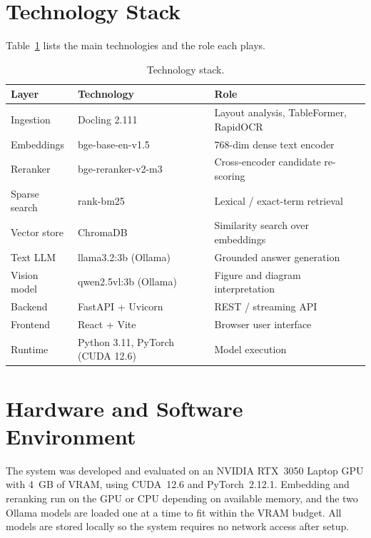 \documentclass[12pt,a4paper]{report}
\begin{document}
\section{Technology Stack}
Table~\ref{tab:stack} lists the main technologies and the role each plays.

\begin{table}[htbp]
\centering
\caption{Technology stack.}
\label{tab:stack}
\begin{tabular}{@{}p{3.4cm}p{3.2cm}p{6.2cm}@{}}
\toprule
\textbf{Layer} & \textbf{Technology} & \textbf{Role} \\
\midrule
Ingestion      & Docling 2.111            & Layout analysis, TableFormer, RapidOCR \\
Embeddings     & bge-base-en-v1.5         & 768-dim dense text encoder \\
Reranker       & bge-reranker-v2-m3       & Cross-encoder candidate re-scoring \\
Sparse search  & rank-bm25                & Lexical / exact-term retrieval \\
Vector store   & ChromaDB                 & Similarity search over embeddings \\
Text LLM       & llama3.2:3b (Ollama)     & Grounded answer generation \\
Vision model   & qwen2.5vl:3b (Ollama)    & Figure and diagram interpretation \\
Backend        & FastAPI + Uvicorn        & REST / streaming API \\
Frontend       & React + Vite             & Browser user interface \\
Runtime        & Python 3.11, PyTorch (CUDA 12.6) & Model execution \\
\bottomrule
\end{tabular}
\end{table}

\section{Hardware and Software Environment}
The system was developed and evaluated on an NVIDIA RTX~3050 Laptop GPU with 4~GB
of VRAM, using CUDA~12.6 and PyTorch~2.12.1. Embedding and reranking run on the
GPU or CPU depending on available memory, and the two Ollama models are loaded one
at a time to fit within the VRAM budget. All models are stored locally so the
system requires no network access after setup.

\end{document}
